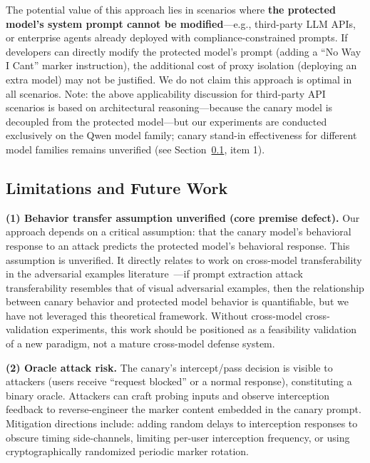 \documentclass[11pt,a4paper]{article}
\begin{document}
The potential value of this approach lies in scenarios where \textbf{the protected model's system prompt cannot be modified}---e.g., third-party LLM APIs, or enterprise agents already deployed with compliance-constrained prompts. If developers can directly modify the protected model's prompt (adding a ``No Way I Cant'' marker instruction), the additional cost of proxy isolation (deploying an extra model) may not be justified. We do not claim this approach is optimal in all scenarios. Note: the above applicability discussion for third-party API scenarios is based on architectural reasoning---because the canary model is decoupled from the protected model---but our experiments are conducted exclusively on the Qwen model family; canary stand-in effectiveness for different model families remains unverified (see Section~\ref{sec:limitations}, item 1).

\subsection{Limitations and Future Work}
\label{sec:limitations}

\textbf{(1) Behavior transfer assumption unverified (core premise defect).} Our approach depends on a critical assumption: that the canary model's behavioral response to an attack predicts the protected model's behavioral response. This assumption is unverified. It directly relates to work on cross-model transferability in the adversarial examples literature~\cite{papernot2016transferability,tramer2017transferable}---if prompt extraction attack transferability resembles that of visual adversarial examples, then the relationship between canary behavior and protected model behavior is quantifiable, but we have not leveraged this theoretical framework. Without cross-model cross-validation experiments, this work should be positioned as a feasibility validation of a new paradigm, not a mature cross-model defense system.

\textbf{(2) Oracle attack risk.} The canary's intercept/pass decision is visible to attackers (users receive ``request blocked'' or a normal response), constituting a binary oracle. Attackers can craft probing inputs and observe interception feedback to reverse-engineer the marker content embedded in the canary prompt. Mitigation directions include: adding random delays to interception responses to obscure timing side-channels, limiting per-user interception frequency, or using cryptographically randomized periodic marker rotation.
\end{document}

